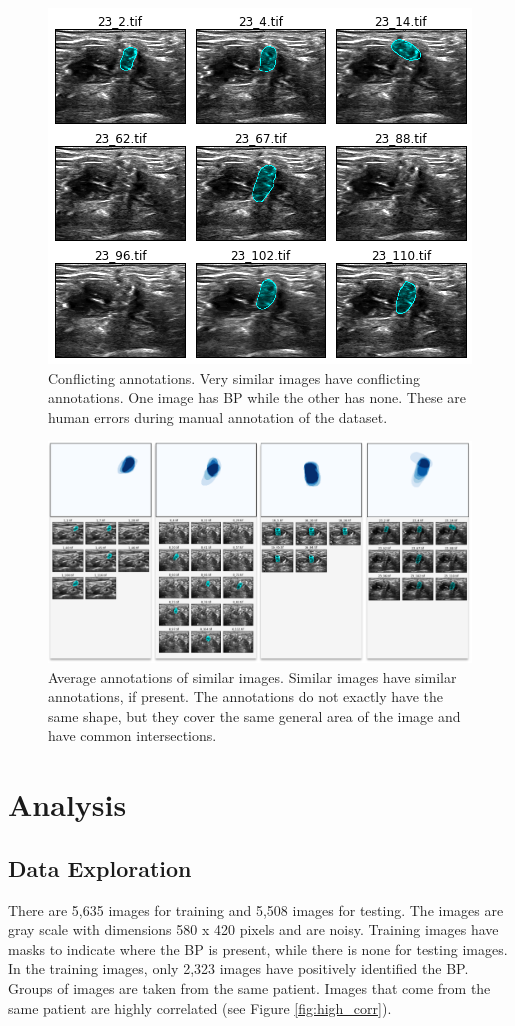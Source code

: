 \documentclass{article}
\begin{document}
\begin{figure}[ht]
 \centering
  \includegraphics[width=0.7\linewidth]{figures/conflicting.png}
  \caption{
      Conflicting annotations. Very similar images have conflicting annotations. One image has BP while the other has none. These are human errors during manual annotation of the dataset.
  }
  \label{fig:conflicting}
\end{figure}


\begin{figure}[ht]
 \centering
  \includegraphics[width=1.0\linewidth]{figures/average_loc.png}
  \caption{
      Average annotations of similar images. Similar images have similar annotations, if present. The annotations do not exactly have the same shape, but they cover the same general area of the image and have common intersections.
  }
  \label{fig:average_loc}
\end{figure}


\section{Analysis}
\subsection{Data Exploration}
There are 5,635 images for training and 5,508 images for testing. The images are gray scale with dimensions 580 x 420 pixels and are noisy. Training images have masks to indicate where the BP is present, while there is none for testing images. In the training images, only 2,323 images have positively identified the BP.
Groups of images are taken from the same patient.  Images that come from the same patient are highly correlated (see Figure \ref{fig:high_corr}).
\end{document}
